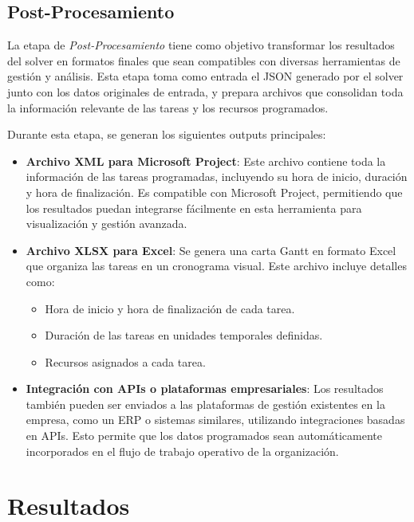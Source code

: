 \documentclass{article}
\begin{document}
\subsection{Post-Procesamiento}

La etapa de \textit{Post-Procesamiento} tiene como objetivo transformar los resultados del solver en formatos finales que sean compatibles con diversas herramientas de gestión y análisis. Esta etapa toma como entrada el JSON generado por el solver junto con los datos originales de entrada, y prepara archivos que consolidan toda la información relevante de las tareas y los recursos programados.

Durante esta etapa, se generan los siguientes outputs principales:

\begin{itemize}
    \item \textbf{Archivo XML para Microsoft Project}: Este archivo contiene toda la información de las tareas programadas, incluyendo su hora de inicio, duración y hora de finalización. Es compatible con Microsoft Project, permitiendo que los resultados puedan integrarse fácilmente en esta herramienta para visualización y gestión avanzada.

    \item \textbf{Archivo XLSX para Excel}: Se genera una carta Gantt en formato Excel que organiza las tareas en un cronograma visual. Este archivo incluye detalles como:
    \begin{itemize}
        \item Hora de inicio y hora de finalización de cada tarea.
        \item Duración de las tareas en unidades temporales definidas.
        \item Recursos asignados a cada tarea.
    \end{itemize}

    \item \textbf{Integración con APIs o plataformas empresariales}: Los resultados también pueden ser enviados a las plataformas de gestión existentes en la empresa, como un ERP o sistemas similares, utilizando integraciones basadas en APIs. Esto permite que los datos programados sean automáticamente incorporados en el flujo de trabajo operativo de la organización.
\end{itemize}


\section{Resultados}
\end{document}
